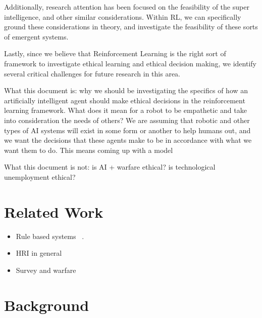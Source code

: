 \documentclass[11pt]{amsart}
\begin{document}
Additionally, research attention has been focused on the feasibility of the super intelligence, and other similar considerations. Within RL, we can specifically ground these considerations in theory, and investigate the feasibility of these sorts of emergent systems.

Lastly, since we believe that Reinforcement Learning is the right sort of framework to investigate ethical learning and ethical decision making, we identify several critical challenges for future research in this area.


What this document is: why we should be investigating the specifics of how an artificially intelligent agent should make ethical decisions in the reinforcement learning framework. What does it mean for a robot to be empathetic and take into consideration the needs of others? We are assuming that robotic and other types of AI systems will exist in some form or another to help humans out, and we want the decisions that these agents make to be in accordance with what we want them to do. This means coming up with a model 

What this document is not: is AI + warfare ethical? is technological unemployment ethical?



\section{Related Work}

\begin{itemize}
\item Rule based systems ~\cite{briggs2015sorry}. 
\item HRI in general~\cite{scheutz2007first,tellex2011understanding}
\item Survey and warfare
\end{itemize}


\section{Background}
\end{document}

